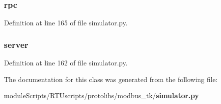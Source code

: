 \subsubsection[{rpc}]{\setlength{\rightskip}{0pt plus 5cm}rpc}\label{classprotolibs_1_1modbus__tk_1_1simulator_1_1_simulator_a0ab21f4419a1405b21abd8a77d54c110}


Definition at line 165 of file simulator.\+py.

\subsubsection[{server}]{\setlength{\rightskip}{0pt plus 5cm}server}\label{classprotolibs_1_1modbus__tk_1_1simulator_1_1_simulator_a4acfaa4e2d9b21de60c9a6fc63cfaa3a}


Definition at line 162 of file simulator.\+py.



The documentation for this class was generated from the following file\+:\begin{DoxyCompactItemize}
\item 
module\+Scripts/\+R\+T\+Uscripts/protolibs/modbus\+\_\+tk/{\bf simulator.\+py}\end{DoxyCompactItemize}
